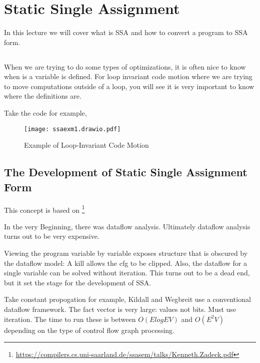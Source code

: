 \section{Static Single Assignment}

In this lecture we will cover what is SSA and how to convert a program to SSA form.

\subsection{}

When we are trying to do some types of optimizations, it is often nice to know when is a variable is defined.
For loop invariant code motion where we are trying to move computations outside of a loop, you will see it is very important to 
know where the definitions are.



Take the code for example, 

\begin{figure}[h]
    \centering
    \texttt{[image: ssaexm1.drawio.pdf]}
    \caption{Example of Loop-Invariant Code Motion}
    \label{fig:ssaexm1}
\end{figure}




\subsection{The Development of Static Single Assignment Form}

This concept is based on \footnote{\url{https://compilers.cs.uni-saarland.de/ssasem/talks/Kenneth.Zadeck.pdf}}


In the very Beginning, there was dataflow analysis.   Ultimately dataflow analysis turns out to be very expensive.

Viewing the program variable by variable exposes structure that is obscured by the dataflow model: 
A kill allows the cfg to be clipped. Also, the dataflow for a single variable can be solved
without iteration. This turns out to be a dead end, but it set the
stage for the development of SSA.


Take constant propogation for example, Kildall and Wegbreit use a conventional
dataflow framework. The fact vector is very large: values not bits. Must use iteration.
The time to run these is between \(O(ElogEV)\) and
\(O(E^2 V)\) depending on the type of control flow
graph processing.



